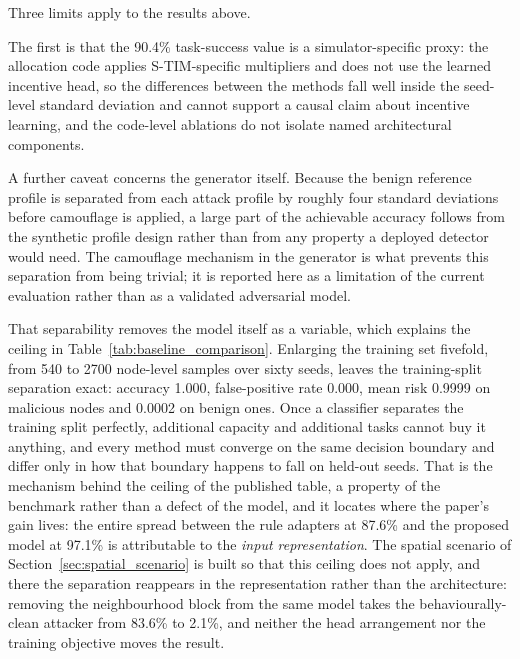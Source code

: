 \documentclass[notspecified,article,submit,moreauthors]{Definitions/mdpi}
\begin{document}
Three limits apply to the results above.

The first is that the 90.4\% task-success value is a simulator-specific proxy: the allocation code applies S-TIM-specific multipliers and does not use the learned incentive head, so the differences between the methods fall well inside the seed-level standard deviation and cannot support a causal claim about incentive learning, and the code-level ablations do not isolate named architectural components.

A further caveat concerns the generator itself. Because the benign reference profile is separated from each attack profile by roughly four standard deviations before camouflage is applied, a large part of the achievable accuracy follows from the synthetic profile design rather than from any property a deployed detector would need. The camouflage mechanism in the generator is what prevents this separation from being trivial; it is reported here as a limitation of the current evaluation rather than as a validated adversarial model.

That separability removes the model itself as a variable, which explains the ceiling in Table~\ref{tab:baseline_comparison}. Enlarging the training set fivefold, from 540 to 2700 node-level samples over sixty seeds, leaves the training-split separation exact: accuracy 1.000, false-positive rate 0.000, mean risk 0.9999 on malicious nodes and 0.0002 on benign ones. Once a classifier separates the training split perfectly, additional capacity and additional tasks cannot buy it anything, and every method must converge on the same decision boundary and differ only in how that boundary happens to fall on held-out seeds. That is the mechanism behind the ceiling of the published table, a property of the benchmark rather than a defect of the model, and it locates where the paper's gain lives: the entire spread between the rule adapters at 87.6\% and the proposed model at 97.1\% is attributable to the \emph{input representation}. The spatial scenario of Section~\ref{sec:spatial_scenario} is built so that this ceiling does not apply, and there the separation reappears in the representation rather than the architecture: removing the neighbourhood block from the same model takes the behaviourally-clean attacker from 83.6\% to 2.1\%, and neither the head arrangement nor the training objective moves the result.
\end{document}
